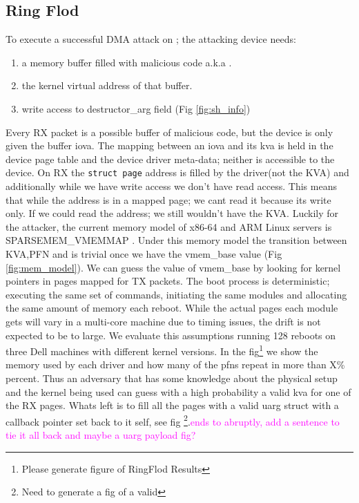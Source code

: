 \subsection{Ring Flod}
To execute a successful DMA attack on \shinfo; the attacking device needs: \begin{enumerate}
    \item a memory buffer filled with malicious code a.k.a \mabaf.
    \item the kernel virtual address of that buffer.
    \item write access to destructor\_arg field (Fig \ref{fig:sh_info})
\end{enumerate} 
Every RX packet is a possible buffer of malicious code, but the device is only given the buffer iova. The mapping between an iova and its kva is held in the device page table and the device driver meta-data; neither is accessible to the device. On RX the \texttt{struct page} address is filled by the driver(not the KVA) and additionally while we have write access we don't have read access. This means that while the \page address is in a mapped page; we cant read it because its write only. If we could read the \page address; we still wouldn't have the KVA. \newline 
Luckily for the attacker, the current memory model of x86-64 and ARM Linux servers is SPARSEMEM\_VMEMMAP \cite{mem_model}. Under this memory model the transition between KVA,PFN and \page is trivial once we have the vmem\_base value (Fig \ref{fig:mem_model}). We can guess the value of vmem\_base by looking for kernel pointers in pages mapped for TX packets.\newline 
The boot process is deterministic; executing the same set of commands, initiating the same modules and allocating the same amount of memory each reboot. While the actual pages each module gets will vary in a multi-core machine due to timing issues, the drift is not expected to be to large. We evaluate this assumptions running 128 reboots on three Dell machines with different kernel versions. In the fig\footnote{Please generate figure of RingFlod Results} we show the memory used by each driver and how many of the pfns repeat in more than X\% percent. Thus an adversary that has some knowledge about the physical setup and the kernel being used can guess with a high probability a valid kva for one of the RX pages. Whats left is to fill all the pages with a valid uarg struct with a callback pointer set back to it self, see fig \footnote{Need to generate a fig of a valid \uarg}.\textcolor{magenta}{ends to abruptly, add a sentence to tie it all back and maybe a uarg payload fig? }

